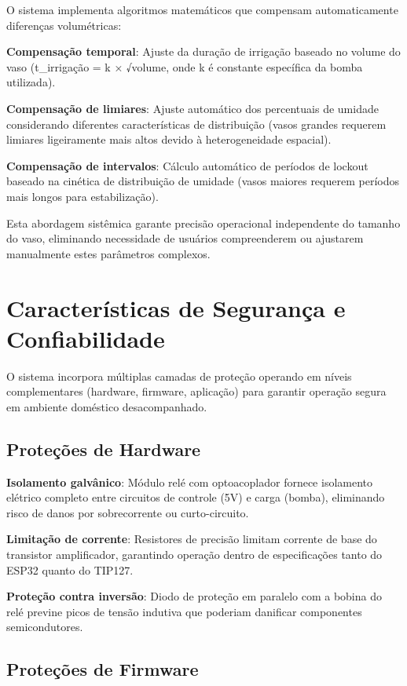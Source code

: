 O sistema implementa algoritmos matemáticos que compensam automaticamente diferenças volumétricas:

\textbf{Compensação temporal}: Ajuste da duração de irrigação baseado no volume do vaso (t\_irrigação = k × √volume, onde k é constante específica da bomba utilizada).

\textbf{Compensação de limiares}: Ajuste automático dos percentuais de umidade considerando diferentes características de distribuição (vasos grandes requerem limiares ligeiramente mais altos devido à heterogeneidade espacial).

\textbf{Compensação de intervalos}: Cálculo automático de períodos de lockout baseado na cinética de distribuição de umidade (vasos maiores requerem períodos mais longos para estabilização).

Esta abordagem sistêmica garante precisão operacional independente do tamanho do vaso, eliminando necessidade de usuários compreenderem ou ajustarem manualmente estes parâmetros complexos.

\section{Características de Segurança e Confiabilidade}

O sistema incorpora múltiplas camadas de proteção operando em níveis complementares (hardware, firmware, aplicação) para garantir operação segura em ambiente doméstico desacompanhado.

\subsection{Proteções de Hardware}

\textbf{Isolamento galvânico}: Módulo relé com optoacoplador fornece isolamento elétrico completo entre circuitos de controle (5V) e carga (bomba), eliminando risco de danos por sobrecorrente ou curto-circuito.

\textbf{Limitação de corrente}: Resistores de precisão limitam corrente de base do transistor amplificador, garantindo operação dentro de especificações tanto do ESP32 quanto do TIP127.

\textbf{Proteção contra inversão}: Diodo de proteção em paralelo com a bobina do relé previne picos de tensão indutiva que poderiam danificar componentes semicondutores.

\subsection{Proteções de Firmware}

